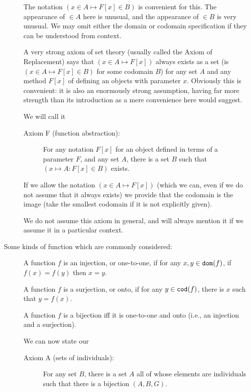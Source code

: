 \documentclass[12pt]{article}
\begin{document}
\begin{description}
The notation $(x \in A \mapsto F[x] \in B)$ is convenient for this.  The appearance of $\in A$ here is unusual, and the appearance of $\in B$ is very unusual.  We may omit either the domain or codomain specification if they can be understood from context.   

A very strong axiom of set theory (usually called the Axiom of Replacement) says that $(x \in A \mapsto F[x])$ always exists as a set (is $(x \in A \mapsto F[x]\in B)$ for some codomain $B$) for any set $A$ and any method $F[x]$ of defining an objects with parameter $x$.  Obviously this is convenient:  it is also an enormously strong assumption, having far more strength than its introduction as a mere convenience here would suggest.

We will call it

\begin{description}

\item[Axiom F (function abstraction):]  For any notation $F[x]$ for an object defined in terms of a parameter $F$, and any set $A$,
there is a set $B$ such that $(x \mapsto A:F[x] \in B)$ exists.  

\end{description}

If we allow the notation $(x \in A \mapsto F[x])$ (which we can, even if we do not assume that it always exists) we provide that the codomain is the image (take the smallest codomain if it is not explicitly given).

We do not assume this axiom in general, and will always mention it if we assume it in a particular context.

\item[Some kinds of function which are commonly considered:]

A function $f$ is an injection, or one-to-one, if for any $x,y \in {\tt dom}(f)$, if $f(x)=f(y)$ then $x=y$.

A function $f$ is a surjection, or onto, if for any $y \in {\tt cod}(f)$, there is $x$ such that $y = f(x)$.

A function $f$ is a bijection iff it is one-to-one and onto (i.e., an injection and a surjection).

We can now state our

\begin{description}

\item[Axiom A (sets of individuals):]  For any set $B$, there is a set $A$ all of whose elements are individuals such
that there is a bijection $(A,B,G)$.


\end{description}
\end{description}
\end{document}
